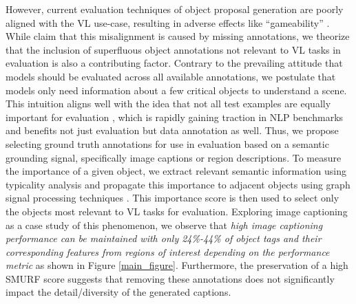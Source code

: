 \documentclass[10pt,twocolumn,letterpaper]{article}
\begin{document}
However, current evaluation techniques of object proposal generation are poorly aligned with the VL use-case, resulting in adverse effects like ``gameability'' \cite{gameable2016}. While \cite{gameable2016} claim that this misalignment is caused by missing annotations, we theorize that the inclusion of superfluous object annotations not relevant to VL tasks in evaluation is also a contributing factor. Contrary to the prevailing attitude that models should be evaluated across all available annotations, we postulate that models only need information about a few critical objects to understand a scene. This intuition aligns well with the idea that not all test examples are equally important for evaluation \cite{notequal2021}, which is rapidly gaining traction in NLP benchmarks and benefits not just evaluation but data annotation as well. Thus, we propose selecting ground truth annotations for use in evaluation based on a semantic grounding signal, specifically image captions or region descriptions. To measure the importance of a given object, we extract relevant semantic information using typicality analysis \cite{smurf2021,typicality1997} and propagate this importance to adjacent objects using graph signal processing techniques \cite{gsp2017}. This importance score is then used to select only the objects most relevant to VL tasks for evaluation. Exploring image captioning as a case study of this phenomenon, we observe that {\it high image captioning performance can be maintained with only 24\%-44\% of object tags and their corresponding features from regions of interest depending on the performance metric} as shown in Figure \ref{main_figure}. Furthermore, the preservation of a high SMURF \cite{smurf2021} score suggests that removing these annotations does not significantly impact the detail/diversity of the generated captions.  
\par
\end{document}
